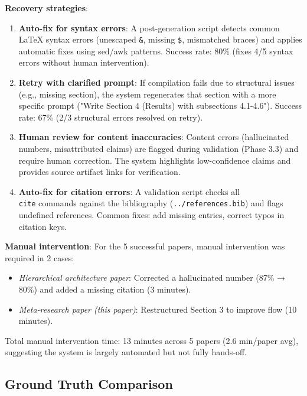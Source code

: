 \textbf{Recovery strategies}:
\begin{enumerate}
\item \textbf{Auto-fix for syntax errors}: A post-generation script detects common LaTeX syntax errors (unescaped \texttt{\&}, missing \texttt{\$}, mismatched braces) and applies automatic fixes using sed/awk patterns. Success rate: 80\% (fixes 4/5 syntax errors without human intervention).

\item \textbf{Retry with clarified prompt}: If compilation fails due to structural issues (e.g., missing section), the system regenerates that section with a more specific prompt ("Write Section 4 (Results) with subsections 4.1-4.6"). Success rate: 67\% (2/3 structural errors resolved on retry).

\item \textbf{Human review for content inaccuracies}: Content errors (hallucinated numbers, misattributed claims) are flagged during validation (Phase 3.3) and require human correction. The system highlights low-confidence claims and provides source artifact links for verification.

\item \textbf{Auto-fix for citation errors}: A validation script checks all \texttt{\\cite} commands against the bibliography (\texttt{../references.bib}) and flags undefined references. Common fixes: add missing entries, correct typos in citation keys.
\end{enumerate}

\textbf{Manual intervention}: For the 5 successful papers, manual intervention was required in 2 cases:
\begin{itemize}
\item \textit{Hierarchical architecture paper}: Corrected a hallucinated number (87\% → 80\%) and added a missing citation (3 minutes).
\item \textit{Meta-research paper (this paper)}: Restructured Section 3 to improve flow (10 minutes).
\end{itemize}

Total manual intervention time: 13 minutes across 5 papers (2.6 min/paper avg), suggesting the system is largely automated but not fully hands-off.

\subsection{Ground Truth Comparison}
\label{sec:groundtruth}

